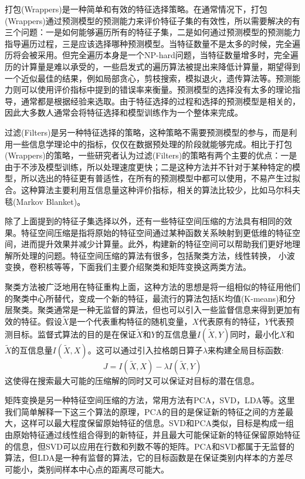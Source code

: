 打包(Wrappers)是一种简单和有效的特征选择策略。在通常情况下，打包(Wrappers)通过预测模型的预测能力来评价特征子集的有效性，所以需要解决的有三个问题：一是如何能够遍历所有的特征子集，二是如何通过预测模型的预测能力指导遍历过程，三是应该选择哪种预测模型。当特征数量不是太多的时候，完全遍历将会被采用。但完全遍历本身是一个NP-hard问题，当特征数量增多时，完全遍历的计算量是难以承受的，一些启发式的遍历算法被提出来降低计算量，期望得到一个近似最佳的结果，例如局部贪心，剪枝搜索，模拟退火，遗传算法等。预测能力则可以使用评价指标中提到的错误率来衡量。预测模型的选择没有太多的理论指导，通常都是根据经验来选取。由于特征选择的过程和选择的预测模型是相关的，因此大多数人通常会将特征选择和模型训练作为一个整体来完成。

过滤(Filters)是另一种特征选择的策略，这种策略不需要预测模型的参与，而是利用一些信息学理论中的指标，仅仅在数据预处理的阶段就能够完成。相比于打包(Wrappers)的策略，一些研究者认为过滤(Filters)的策略有两个主要的优点：一是由于不涉及模型训练，所以处理速度更快；二是这种方法并不针对于某种特定的模型，所以选出的特征更有普适性，在所有的预测模型中都可以使用，不易产生过拟合。这种算法主要利用互信息量这种评价指标，相关的算法比较少，比如马尔科夫毯(Markov Blanket)。

除了上面提到的特征子集选择以外，还有一些特征空间压缩的方法具有相同的效果。特征空间压缩是指将原始的特征空间通过某种函数关系映射到更低维的特征空间，进而提升效果并减少计算量。此外，构建新的特征空间可以帮助我们更好地理解所处理的问题。特征空间压缩的算法有很多，包括聚类方法，线性转换，
小波变换，卷积核等等，下面我们主要介绍聚类和矩阵变换这两类方法。

聚类方法被广泛地用在特征重构上面，这种方法的思想是将一组相似的特征用他们的聚类中心所替代，变成一个新的特征，最流行的算法包括K均值(K-means)和分层聚类。聚类通常是一种无监督的算法，但也可以引入一些监督信息来得到更加有效的特征。假设$\widetilde{X}$是一个代表重构特征的随机变量，$X$代表原有的特征，$Y$代表预测目标。监督式算法的目的是在保证$\widetilde{X}$和$Y$的互信息量$I(\widetilde{X}, Y)$同时，最小化$X$和$\widetilde{X}$的互信息量$I(\widetilde{X}, X)$。这可以通过引入拉格朗日算子$\lambda$来构建全局目标函数:
\begin{equation}
\label{equ:lagrange_multiplier}
    J=I(\widetilde{X}, X) - \lambda I(\widetilde{X}, Y)
\end{equation}
这使得在搜索最大可能的压缩解的同时又可以保证对目标的潜在信息。

矩阵变换是另一种特征空间压缩的方法，常用方法有PCA，SVD，LDA等。这里我们简单解释一下这三个算法的原理，PCA的目的是保证新的特征之间的方差最大，这样可以最大程度保留原始特征的信息。SVD和PCA类似，目标是构成一组由原始特征通过线性组合得到的新特征，并且最大可能保证新的特征保留原始特征的信息，但SVD可以应用在行数和列数不等的矩阵。PCA和SVD都属于无监督的算法，但LDA是一种有监督的算法，它的目标函数是在保证类别内样本的方差尽可能小，类别间样本中心点的距离尽可能大。
 

